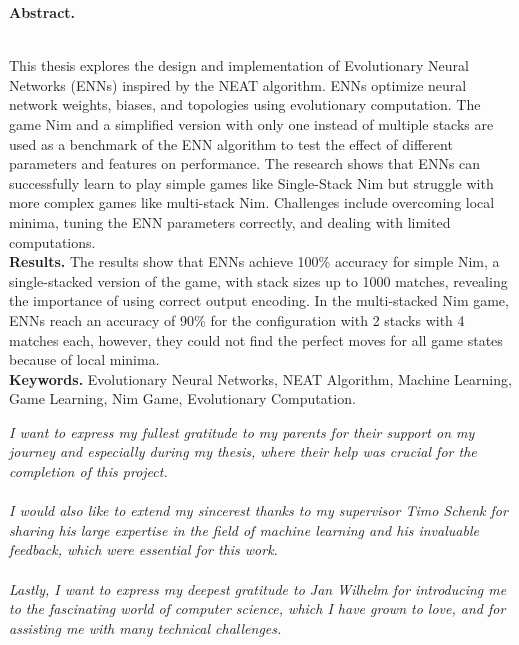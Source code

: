 \documentclass[11pt]{report}
\begin{document}
    \begin{doublespace}
        \begin{center}
            \textbf{Abstract.}
        \end{center}
        \\
        This thesis explores the design and implementation of Evolutionary Neural Networks (ENNs) inspired by the NEAT algorithm.
        ENNs optimize neural network weights, biases, and topologies using evolutionary computation.
        The game Nim and a simplified version with only one instead of multiple stacks are used as a benchmark of the ENN algorithm to test the effect of different parameters and features on performance.
        The research shows that ENNs can successfully learn to play simple games like Single-Stack Nim but struggle with more complex games like multi-stack Nim.
        Challenges include overcoming local minima, tuning the ENN parameters correctly, and dealing with limited computations.
        \\
        \textbf{Results.}
        The results show that ENNs achieve 100\% accuracy for simple Nim, a single-stacked version of the game, with stack sizes up to 1000 matches, revealing the importance of using correct output encoding.
        In the multi-stacked Nim game, ENNs reach an accuracy of 90\% for the configuration with 2 stacks with 4 matches each, however, they could not find the perfect moves for all game states because of local minima.
        \\
        \textbf{Keywords.}
        Evolutionary Neural Networks, NEAT Algorithm, Machine Learning, Game Learning, Nim Game, Evolutionary Computation.

        \newpage
        \vspace*{5em}
        \begin{adjustwidth}{2cm}{2cm}
            \textit{
                I want to express my fullest gratitude to my parents for their support on my journey and especially during my thesis, where their help was crucial for the completion of this project.
                \\ \\
                I would also like to extend my sincerest thanks to my supervisor Timo Schenk for sharing his large expertise in the field of machine learning and his invaluable feedback, which were essential for this work.
                \\ \\
                Lastly, I want to express my deepest gratitude to Jan Wilhelm for introducing me to the fascinating world of computer science, which I have grown to love, and for assisting me with many technical challenges.
            }
        \end{adjustwidth}
    \end{doublespace}
    \newpage
\end{document}
